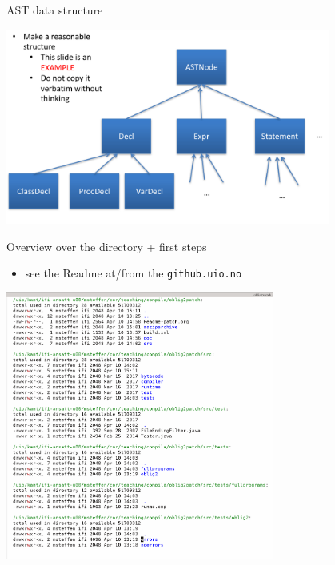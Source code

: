 \documentclass{beamer}
\begin{document}
\begin{frame}[label={sec:org73a994b}]{AST data structure}

\begin{center}
 \includegraphics[width=0.8\textwidth]{figures/snaps/astclasses}
\end{center}
\end{frame}




\begin{frame}[label={sec:org63aa17b},fragile]{Overview over the directory + first steps}
 \begin{itemize}
\item see the Readme at/from the \texttt{github.uio.no}
\end{itemize}


\includegraphics[width=0.66\textwidth]{figures/snaps/directorystruct}
\end{frame}
\end{document}
